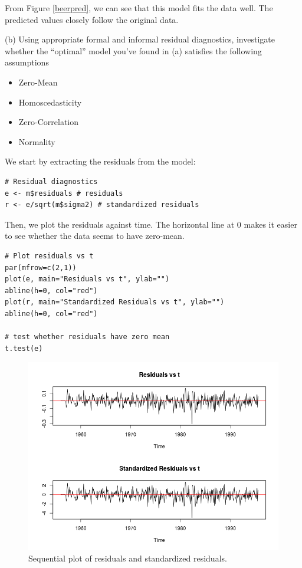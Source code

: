 \documentclass[]{article}
\begin{document}
From Figure \ref{beerpred}, we can see that this model fits the data well. The predicted values closely follow the original data.

\color{black}

(b) Using appropriate formal and informal residual diagnostics, investigate whether the “optimal” model you’ve found in (a) satisfies the following assumptions
\begin{itemize}
  \item Zero-Mean
  \item Homoscedasticity
  \item Zero-Correlation
  \item Normality
\end{itemize}

\color{blue}
We start by extracting the residuals from the model:
\begin{Verbatim}[frame=single]
# Residual diagnostics
e <- m$residuals # residuals
r <- e/sqrt(m$sigma2) # standardized residuals
\end{Verbatim}

Then, we plot the residuals against time. The horizontal line at 0 makes it easier to see whether the data seems to have zero-mean.
\begin{Verbatim}[frame=single]
# Plot residuals vs t
par(mfrow=c(2,1))
plot(e, main="Residuals vs t", ylab="")
abline(h=0, col="red")
plot(r, main="Standardized Residuals vs t", ylab="")
abline(h=0, col="red")

# test whether residuals have zero mean
t.test(e)
\end{Verbatim}

\begin{figure}[!ht]
\centering
\includegraphics[width=.8\textwidth]{lbeerseq.png}
\caption{Sequential plot of residuals and standardized residuals.}
\label{lbeerseq}
\end{figure}
\end{document}
